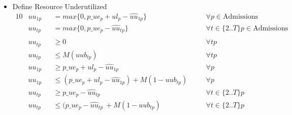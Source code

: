 \begin{itemize}
	\item Define Resource Underutilized
	\begin{alignat}{10}
		& uu_{1p} 
			&& = max\{0 , p\_ue_{p} + ul_{p} - \hat{uu}_{1p}\} \quad 
			&& \forall p \in {\text{Admissions}} \\ 
		& uu_{tp} 
			&& = max\{0 , p\_ue_{p} - \hat{uu}_{tp}\} \quad
			&& \forall t \in \{2..T\} p \in {\text{Admissions}} \\ \\
		& uu_{tp} 
			&&\ge 0 \quad
			&& \forall tp \\
		& uu_{tp} 
			&& \le  M(uub_{tp}) \quad
			&& \forall tp \\
		& uu_{1p} 
			&&\ge p\_ue_{p} + ul_{p} - \hat{uu}_{1p} \quad
			&& \forall p \\
		& uu_{1p} 
		&& \le  (p\_ue_{p} + ul_{p} - \hat{uu}_{1p}) + M(1-uub_{tp}) \quad
		&& \forall p \\
		& uu_{tp} 
			&&\ge p\_ue_{p} - \hat{uu}_{tp}\ \quad
			&& \forall t \in \{2..T \} p \\
		& uu_{tp} 
		&& \le  (p\_ue_{p} - \hat{uu}_{tp}\ + M(1-uub_{tp}) \quad
		&& \forall t \in \{ 2..T \} p \\
	\end{alignat}
\end{itemize}

